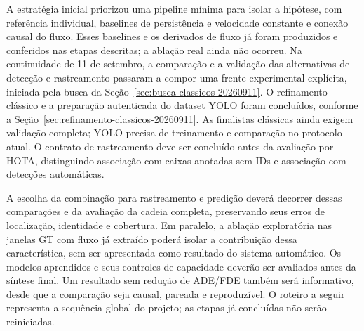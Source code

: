 A estratégia inicial priorizou uma pipeline mínima para isolar a hipótese, com referência individual, baselines de persistência e velocidade constante e conexão causal do fluxo. Esses baselines e os derivados de fluxo já foram produzidos e conferidos nas etapas descritas; a ablação real ainda não ocorreu. Na continuidade de 11 de setembro, a comparação e a validação das alternativas de detecção e rastreamento passaram a compor uma frente experimental explícita, iniciada pela busca da Seção~\ref{sec:busca-classicos-20260911}. O refinamento clássico e a preparação autenticada do dataset YOLO foram concluídos, conforme a Seção~\ref{sec:refinamento-classicos-20260911}. As finalistas clássicas ainda exigem validação completa; YOLO precisa de treinamento e comparação no protocolo atual. O contrato de rastreamento deve ser concluído antes da avaliação por HOTA, distinguindo associação com caixas anotadas sem IDs e associação com detecções automáticas.

A escolha da combinação para rastreamento e predição deverá decorrer dessas comparações e da avaliação da cadeia completa, preservando seus erros de localização, identidade e cobertura. Em paralelo, a ablação exploratória nas janelas GT com fluxo já extraído poderá isolar a contribuição dessa característica, sem ser apresentada como resultado do sistema automático. Os modelos aprendidos e seus controles de capacidade deverão ser avaliados antes da síntese final. Um resultado sem redução de ADE/FDE também será informativo, desde que a comparação seja causal, pareada e reproduzível. O roteiro a seguir representa a sequência global do projeto; as etapas já concluídas não serão reiniciadas.

